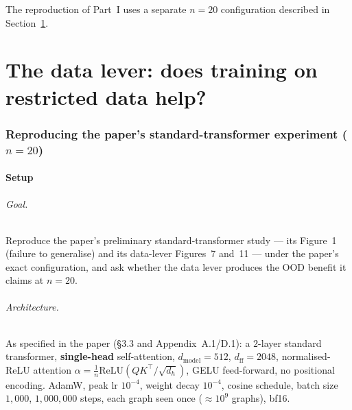 \documentclass[11pt,a4paper]{article}
\begin{document}
The reproduction of Part~I uses a separate $n = 20$ configuration described in
Section~\ref{sec:repro}.

\part{The data lever: does training on restricted data help?}

\section{Reproducing the paper's standard-transformer experiment ($n = 20$)}
\label{sec:repro}

\subsection{Setup}

\paragraph{Goal.} Reproduce the paper's preliminary standard-transformer study
--- its Figure~1 (failure to generalise) and its data-lever Figures~7 and~11 ---
under the paper's exact configuration, and ask whether the data lever produces
the OOD benefit it claims at $n = 20$.

\paragraph{Architecture.} As specified in the paper (\S3.3 and Appendix~A.1/D.1):
a $2$-layer standard transformer, \textbf{single-head} self-attention,
$d_{\mathrm{model}} = 512$, $d_{\mathrm{ff}} = 2048$, normalised-ReLU attention
$\alpha = \tfrac{1}{n}\mathrm{ReLU}(QK^\top/\sqrt{d_h})$, GELU feed-forward, no
positional encoding. AdamW, peak lr $10^{-4}$, weight decay $10^{-4}$, cosine
schedule, batch size $1{,}000$, $1{,}000{,}000$ steps, each graph seen once
($\approx 10^9$ graphs), bf16.
\end{document}
